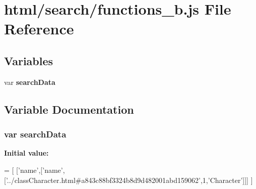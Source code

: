 \section{html/search/functions\-\_\-b.js File Reference}
\label{functions__b_8js}
\subsection*{Variables}
\begin{DoxyCompactItemize}
\item 
var {\bf search\-Data}
\end{DoxyCompactItemize}


\subsection{Variable Documentation}
\subsubsection[{search\-Data}]{\setlength{\rightskip}{0pt plus 5cm}var search\-Data}\label{functions__b_8js_ad01a7523f103d6242ef9b0451861231e}
{\bfseries Initial value\-:}
\begin{DoxyCode}
=
[
  [\textcolor{stringliteral}{'name'},[\textcolor{stringliteral}{'name'},[\textcolor{stringliteral}{'../classCharacter.html#a843c88bf3324b8d9d482001abd159062'},1,\textcolor{stringliteral}{'Character'}]]]
]
\end{DoxyCode}
